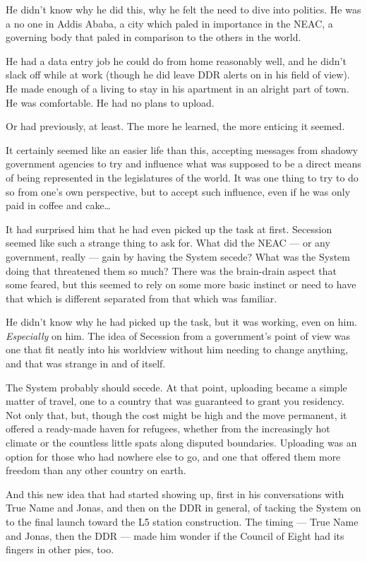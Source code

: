 He didn't know why he did this, why he felt the need to dive into politics. He was a no one in Addis Ababa, a city which paled in importance in the NEAC, a governing body that paled in comparison to the others in the world.

He had a data entry job he could do from home reasonably well, and he didn't slack off while at work (though he did leave DDR alerts on in his field of view). He made enough of a living to stay in his apartment in an alright part of town. He was comfortable. He had no plans to upload.

Or had previously, at least. The more he learned, the more enticing it seemed.

It certainly seemed like an easier life than this, accepting messages from shadowy government agencies to try and influence what was supposed to be a direct means of being represented in the legislatures of the world. It was one thing to try to do so from one's own perspective, but to accept such influence, even if he was only paid in coffee and cake\ldots{}

It had surprised him that he had even picked up the task at first. Secession seemed like such a strange thing to ask for. What did the NEAC — or any government, really — gain by having the System secede? What was the System doing that threatened them so much? There was the brain-drain aspect that some feared, but this seemed to rely on some more basic instinct or need to have that which is different separated from that which was familiar.

He didn't know why he had picked up the task, but it was working, even on him. \emph{Especially} on him. The idea of Secession from a government's point of view was one that fit neatly into his worldview without him needing to change anything, and that was strange in and of itself.

The System probably should secede. At that point, uploading became a simple matter of travel, one to a country that was guaranteed to grant you residency. Not only that, but, though the cost might be high and the move permanent, it offered a ready-made haven for refugees, whether from the increasingly hot climate or the countless little spats along disputed boundaries. Uploading was an option for those who had nowhere else to go, and one that offered them more freedom than any other country on earth.

And this new idea that had started showing up, first in his conversations with True Name and Jonas, and then on the DDR in general, of tacking the System on to the final launch toward the L5 station construction. The timing — True Name and Jonas, then the DDR — made him wonder if the Council of Eight had its fingers in other pies, too.

